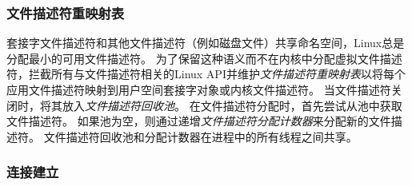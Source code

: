 


\subsubsection{文件描述符重映射表}
\label{socksdirect:subsubsec:fd-remapping-table}



套接字文件描述符和其他文件描述符（例如磁盘文件）共享命名空间，Linux总是分配最小的可用文件描述符。
为了保留这种语义而不在内核中分配虚拟文件描述符，\libipc {}拦截所有与文件描述符相关的Linux API并维护\emph {文件描述符重映射表}以将每个应用文件描述符映射到用户空间套接字对象或内核文件描述符。
当文件描述符关闭时，\libipc {}将其放入\emph {文件描述符回收池}。
在文件描述符分配时，\libipc {}首先尝试从池中获取文件描述符。
如果池为空，则通过递增\emph {文件描述符分配计数器}来分配新的文件描述符。
文件描述符回收池和分配计数器在进程中的所有线程之间共享。

\subsubsection{连接建立}


